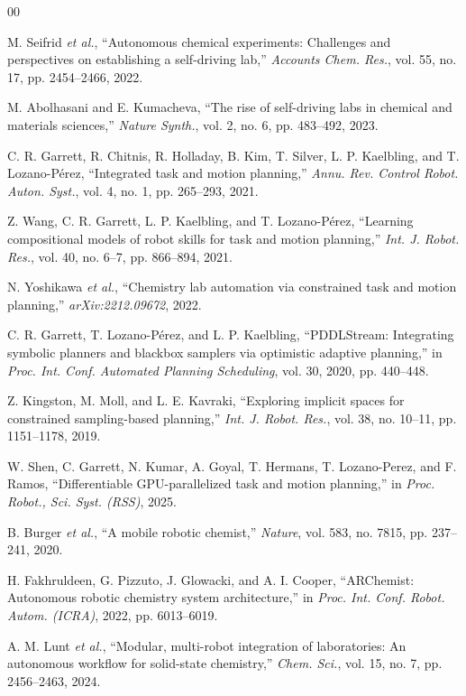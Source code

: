 \documentclass{ieeeaccess}
\begin{document}
\begin{thebibliography}{00}

 M. Seifrid \emph{et al.}, ``Autonomous chemical experiments: Challenges and perspectives on establishing a self-driving lab,'' \emph{Accounts Chem. Res.}, vol. 55, no. 17, pp. 2454--2466, 2022.

 M. Abolhasani and E. Kumacheva, ``The rise of self-driving labs in chemical and materials sciences,'' \emph{Nature Synth.}, vol. 2, no. 6, pp. 483--492, 2023.

 C. R. Garrett, R. Chitnis, R. Holladay, B. Kim, T. Silver, L. P. Kaelbling, and T. Lozano-P\'erez, ``Integrated task and motion planning,'' \emph{Annu. Rev. Control Robot. Auton. Syst.}, vol. 4, no. 1, pp. 265--293, 2021.

 Z. Wang, C. R. Garrett, L. P. Kaelbling, and T. Lozano-P\'erez, ``Learning compositional models of robot skills for task and motion planning,'' \emph{Int. J. Robot. Res.}, vol. 40, no. 6--7, pp. 866--894, 2021.

 N. Yoshikawa \emph{et al.}, ``Chemistry lab automation via constrained task and motion planning,'' \emph{arXiv:2212.09672}, 2022.

 C. R. Garrett, T. Lozano-P\'erez, and L. P. Kaelbling, ``PDDLStream: Integrating symbolic planners and blackbox samplers via optimistic adaptive planning,'' in \emph{Proc. Int. Conf. Automated Planning Scheduling}, vol. 30, 2020, pp. 440--448.

 Z. Kingston, M. Moll, and L. E. Kavraki, ``Exploring implicit spaces for constrained sampling-based planning,'' \emph{Int. J. Robot. Res.}, vol. 38, no. 10--11, pp. 1151--1178, 2019.

 W. Shen, C. Garrett, N. Kumar, A. Goyal, T. Hermans, T. Lozano-Perez, and F. Ramos, ``Differentiable GPU-parallelized task and motion planning,'' in \emph{Proc. Robot., Sci. Syst. (RSS)}, 2025.

 B. Burger \emph{et al.}, ``A mobile robotic chemist,'' \emph{Nature}, vol. 583, no. 7815, pp. 237--241, 2020.

 H. Fakhruldeen, G. Pizzuto, J. Glowacki, and A. I. Cooper, ``ARChemist: Autonomous robotic chemistry system architecture,'' in \emph{Proc. Int. Conf. Robot. Autom. (ICRA)}, 2022, pp. 6013--6019.

 A. M. Lunt \emph{et al.}, ``Modular, multi-robot integration of laboratories: An autonomous workflow for solid-state chemistry,'' \emph{Chem. Sci.}, vol. 15, no. 7, pp. 2456--2463, 2024.


\end{thebibliography}
\end{document}
